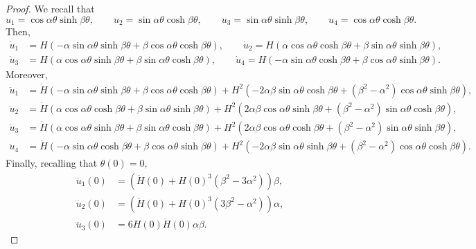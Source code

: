 \documentclass[10pt,a4paper]{amsart}
\begin{document}
\begin{proof}
We recall that
\begin{equation*}
u_1=\cos \alpha\theta\sinh\beta\theta,\qquad
u_2=\sin \alpha\theta\cosh\beta\theta,\qquad
u_3= \sin \alpha\theta\sinh\beta\theta,\qquad
u_4=\cos \alpha\theta\cosh\beta\theta.
\end{equation*}
Then,
\begin{align*}
\dot u_1&=H\left(-\alpha\sin\alpha\theta\sinh\beta\theta+\beta\cos\alpha\theta\cosh\beta\theta\right),\qquad\dot u_2=H\left(\alpha\cos\alpha\theta\cosh\beta\theta+\beta\sin\alpha\theta\sinh\beta\theta\right),\\
\dot u_3&=H\left(\alpha\cos\alpha\theta\sinh\beta\theta+\beta\sin\alpha\theta\cosh\beta\theta\right),\qquad\dot u_4=H\left(-\alpha\sin\alpha\theta\cosh\beta\theta+\beta\cos\alpha\theta\sinh\beta\theta\right).
\end{align*}
Moreover,
\begin{align*}
\ddot u_1&=\dot H\left(-\alpha\sin\alpha\theta\sinh\beta\theta+\beta\cos\alpha\theta\cosh\beta\theta\right)+H^2\left(-2\alpha\beta\sin\alpha\theta\cosh\beta\theta+\left(\beta^2-\alpha^2\right)\cos\alpha\theta\sinh\beta\theta\right),\\
\ddot u_2&=\dot H\left(\alpha\cos\alpha\theta\cosh\beta\theta+\beta\sin\alpha\theta\sinh\beta\theta\right)+H^2\left(2\alpha\beta\cos\alpha\theta\sinh\beta\theta+\left(\beta^2-\alpha^2\right)\sin\alpha\theta\cosh\beta\theta\right),\\
\ddot u_3&=\dot H\left(\alpha\cos\alpha\theta\sinh\beta\theta+\beta\sin\alpha\theta\cosh\beta\theta\right)+H^2\left(2\alpha\beta\cos\alpha\theta\cosh\beta\theta+\left(\beta^2-\alpha^2\right)\sin\alpha\theta\sinh\beta\theta\right),\\
\ddot u_4&=\dot H\left(-\alpha\sin\alpha\theta\cosh\beta\theta+\beta\cos\alpha\theta\sinh\beta\theta\right)+H^2\left(-2\alpha\beta\sin\alpha\theta\sinh\beta\theta+\left(\beta^2-\alpha^2\right)\cos\alpha\theta\cosh\beta\theta\right).
\end{align*}
Finally, recalling that $\theta(0)=0,$
\begin{align*}
\dddot u_1(0)&=\left(\ddot H(0)+H(0)^3\left(\beta^2-3\alpha^2\right)\right)\beta,\\ \dddot u_2(0)&=\left(\ddot H(0)+H(0)^3\left(3\beta^2-\alpha^2\right)\right)\alpha,\\  \dddot u_3(0)&=6H(0)\dot H(0)\alpha\beta.

\end{align*}
\end{proof}
\end{document}
